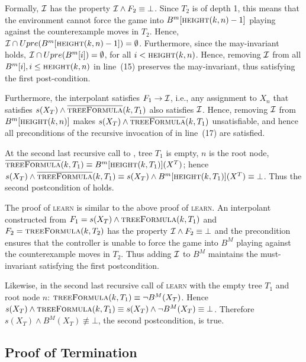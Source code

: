 Formally, $\mathcal{I}$ has the property $\mathcal{I} \land F_2 \equiv \bot$.  Since $T_2$ is
of depth 1, this means that the environment cannot force the game into
$B^m[\textsc{height}(k, n)-1]$ playing against the counterexample moves in $T_2$.
Hence, $\mathcal{I} \cap Upre(B^m[\textsc{height}(k, n)-1]) = \emptyset$.  Furthermore,
since the may-invariant holds, $\mathcal{I} \cap Upre(B^m[i]) =
\emptyset$, for all $i < \textsc{height}(k, n)$.  Hence, removing $\mathcal{I}$ from all
$B^m[i], i\leq \textsc{height}(k, n)$ in line~(15) preserves the may-invariant,
thus satisfying the first post-condition.

Furthermore, the interpolant satisfies $F_1 \rightarrow \mathcal{I}$, i.e., any
assignment to $X_n$ that satisfies $s(X_T) \land
\textsc{$\overline{\mbox{treeFormula}}$}(k, T_1)$ also satisfies $\mathcal{I}$.  Hence,
removing $\mathcal{I}$ from $B^m[\textsc{height}(k, n)]$ makes $s(X_T) \land
\textsc{$\overline{\mbox{treeFormula}}$}(k, T_1)$ unsatisfiable, and hence all
preconditions of the recursive invocation of \textsc{} in
line~(17) are satisfied.  

At the second last recursive call to \textsc{}, tree $T_1$
is empty, $n$ is the root node, $\textsc{$\overline{\mbox{treeFormula}}$}(k, T_1)
\equiv B^m[\textsc{height}(k, T_1)](X^T)$; hence $s(X_T) \land
\textsc{$\overline{\mbox{treeFormula}}$}(k, T_1) \equiv s(X_T) \land
B^m[\textsc{height}(k, T_1)](X^T) \equiv \bot$.  Thus the second postcondition of
\textsc{} holds.

The proof of \textsc{learn} is similar to the above proof of \textsc{learn}. An
interpolant constructed from $F_1=s(X_T) \land \textsc{treeFormula}(k, T_1)$
and $F_2 = \textsc{treeFormula}(k, T_2)$ has the property $\mathcal{I} \land F_2 \equiv
\bot$ and the precondition ensures that the controller is unable to force the
game into $B^M$ playing against the counterexample moves in $T_2$. Thus adding
$\mathcal{I}$ to $B^M$ maintains the must-invariant satisfying the first postcondition.

Likewise, in the second last recursive call of \textsc{learn} with the empty
tree $T_1$ and root node $n$: $\textsc{treeFormula}(k, T_1) \equiv \lnot
B^M(X_T)$.  Hence $s(X_T) \land \textsc{treeFormula}(k, T_1) \equiv
s(X_T) \land \lnot B^M(X_T) \equiv \bot$. Therefore $s(X_T) \land
B^M(X_T) \not\equiv \bot$, the second postcondition, is true.

\subsection{Proof of Termination}

